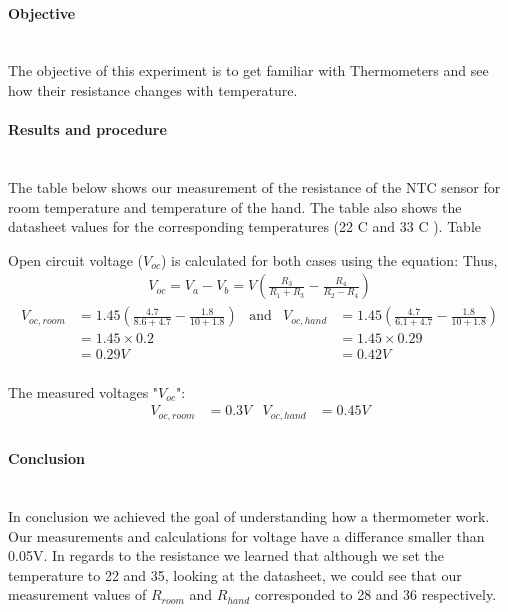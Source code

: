 \paragraph*{Objective} \hfill \\
The objective of this experiment is to get familiar with Thermometers and see how their resistance changes with temperature.
\paragraph*{Results and procedure} \hfill\\
The table below shows our measurement of the resistance of the NTC sensor for room temperature and temperature of the hand. The table also shows the datasheet values for the corresponding temperatures (22 C and 33 C ).
Table

Open circuit voltage ($ V_{oc} $) is calculated for both cases using the equation:
Thus,
\begin{align*}
V_{oc}=V_{a}-V_{b}=V(\frac{R_{3}}{R_{1}+R_{3}}-\frac{R_{4}}{R_{2}-R_{4}})
\end{align*}
\begin{align*}
V_{oc,room}&=1.45(\frac{4.7}{8.6+4.7}-\frac{1.8}{10+1.8})	\,\,\,\,\,\text{and}&	V_{oc,hand}&=1.45(\frac{4.7}{6.1+4.7}-\frac{1.8}{10+1.8})\\
&=1.45 \times 0.2	&	&=1.45 \times 0.29 \\
&= 0.29V	&	&= 0.42V \\
\end{align*}

The measured voltages "$ V_{oc} $":
\begin{align*}
V_{oc,room}&=0.3V	&	V_{oc,hand}&=0.45V \\
\end{align*}
\paragraph*{Conclusion} \hfill \\
In conclusion we achieved the goal of understanding how a thermometer work. Our measurements and calculations for voltage have a differance smaller than 0.05V. In regards to the resistance we learned that although we set the temperature to 22 and 35, looking at the datasheet, we could see that our measurement values of $R_{room}$ and $R_{hand}$ corresponded to 28 and 36 respectively.